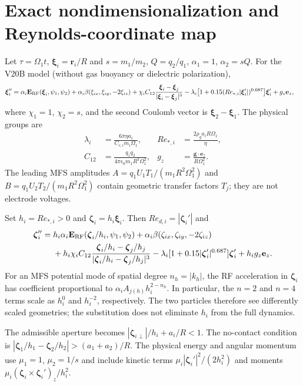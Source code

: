 \section{Exact nondimensionalization and Reynolds-coordinate map}
Let $\tau=\Omega_1t$, $\boldsymbol\xi_i=\mathbf r_i/R$ and
$s=m_1/m_2$, $Q=q_2/q_1$, $\alpha_1=1$, $\alpha_2=sQ$.
For the V20B model (without gas buoyancy or dielectric polarization),
\begin{align}
\boldsymbol\xi_i''={}&\alpha_i\mathbf E_{\rm RF}(\boldsymbol\xi_i,\psi_1,\psi_2)
+\alpha_i\beta(\xi_{ix},\xi_{iy},-2\xi_{iz})
+\chi_i C_{12}\frac{\boldsymbol\xi_i-\boldsymbol\xi_j}
 {|\boldsymbol\xi_i-\boldsymbol\xi_j|^3}
-\lambda_i\bigl[1+0.15(Re_{*,i}|\boldsymbol\xi_i'|)^{0.687}\bigr]
 \boldsymbol\xi_i'+g_z\mathbf e_z,
\end{align}
where $\chi_1=1$, $\chi_2=s$, and the second Coulomb vector is
$\boldsymbol\xi_2-\boldsymbol\xi_1$.
The physical groups are
\begin{align}
\lambda_i&=\frac{6\pi\eta a_i}{C_{c,i}m_i\Omega_1}, &
Re_{*,i}&=\frac{2\rho_g a_i R\Omega_1}{\eta},\\
C_{12}&=\frac{q_1q_2}{4\pi\epsilon_0m_1R^3\Omega_1^2}, &
g_z&=\frac{\mathbf g\cdot\mathbf e_z}{R\Omega_1^2}.
\end{align}
The leading MFS amplitudes $A=q_1U_1T_1/(m_1R^2\Omega_1^2)$ and
$B=q_1U_2T_2/(m_1R^2\Omega_1^2)$ contain geometric transfer factors
$T_j$; they are not electrode voltages.

Set $h_i=Re_{*,i}>0$ and $\boldsymbol\zeta_i=h_i\boldsymbol\xi_i$.
Then $Re_{d,i}=|\boldsymbol\zeta_i'|$ and
\begin{align}
\boldsymbol\zeta_i''={}&h_i\alpha_i
\mathbf E_{\rm RF}(\boldsymbol\zeta_i/h_i,\psi_1,\psi_2)
+\alpha_i\beta(\zeta_{ix},\zeta_{iy},-2\zeta_{iz})\\
&+h_i\chi_i C_{12}
\frac{\boldsymbol\zeta_i/h_i-\boldsymbol\zeta_j/h_j}
 {|\boldsymbol\zeta_i/h_i-\boldsymbol\zeta_j/h_j|^3}
-\lambda_i[1+0.15|\boldsymbol\zeta_i'|^{0.687}]
\boldsymbol\zeta_i'+h_i g_z\mathbf e_z.
\end{align}
For an MFS potential mode of spatial degree $n_h=|k_h|$, the RF
acceleration in $\boldsymbol\zeta_i$ has coefficient proportional to
$\alpha_i A_{j(h)}h_i^{2-n_h}$. In particular, the $n=2$ and $n=4$
terms scale as $h_i^0$ and $h_i^{-2}$, respectively. The two particles
therefore see differently scaled geometries; the substitution does not
eliminate $h_i$ from the full dynamics.

The admissible aperture becomes $|\boldsymbol\zeta_{i\perp}|/h_i+a_i/R<1$.
The no-contact condition is
$|\boldsymbol\zeta_1/h_1-\boldsymbol\zeta_2/h_2|>(a_1+a_2)/R$.
The physical energy and angular momentum use
$\mu_1=1$, $\mu_2=1/s$ and include kinetic terms
$\mu_i|\boldsymbol\zeta_i'|^2/(2h_i^2)$ and moments
$\mu_i(\boldsymbol\zeta_i\times\boldsymbol\zeta_i')_z/h_i^2$.
